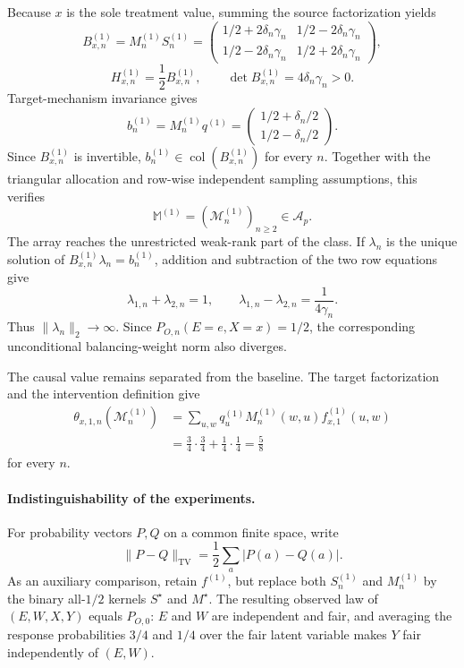 Because \(x\) is the sole treatment value, summing the source factorization yields
\[
B^{(1)}_{x,n}=M^{(1)}_nS^{(1)}_n=
\begin{pmatrix}
1/2+2\delta_n\gamma_n&1/2-2\delta_n\gamma_n\\
1/2-2\delta_n\gamma_n&1/2+2\delta_n\gamma_n
\end{pmatrix},
\]
\[
H^{(1)}_{x,n}=\frac12B^{(1)}_{x,n},
\qquad
\det B^{(1)}_{x,n}=4\delta_n\gamma_n>0.
\]
Target-mechanism invariance gives
\[
b^{(1)}_n=M^{(1)}_nq^{(1)}
=
\begin{pmatrix}1/2+\delta_n/2\\1/2-\delta_n/2\end{pmatrix}.
\]
Since \(B^{(1)}_{x,n}\) is invertible,
\(b^{(1)}_n\in\operatorname{col}(B^{(1)}_{x,n})\) for every \(n\). Together with the triangular allocation and row-wise independent sampling assumptions, this verifies
\[
\mathbb M^{(1)}=(\mathcal M^{(1)}_n)_{n\ge2}\in\mathcal A_p.
\]
The array reaches the unrestricted weak-rank part of the class. If \(\lambda_n\) is the unique solution of
\(B^{(1)}_{x,n}\lambda_n=b^{(1)}_n\), addition and subtraction of the two row equations give
\[
\lambda_{1,n}+\lambda_{2,n}=1,\qquad
\lambda_{1,n}-\lambda_{2,n}=\frac1{4\gamma_n}.
\]
Thus \(\lVert\lambda_n\rVert_2\to\infty\). Since
\(P_{O,n}(E=e,X=x)=1/2\), the corresponding unconditional balancing-weight norm also diverges.

The causal value remains separated from the baseline. The target factorization and the intervention definition give
\[
\begin{split}
\theta_{x,1,n}(\mathcal M^{(1)}_n)
&=\sum_{u,w}q^{(1)}_uM^{(1)}_n(w,u)f^{(1)}_{x,1}(u,w)\\
&=\frac34\cdot\frac34+\frac14\cdot\frac14
=\frac58
\end{split}
\]
for every \(n\).

\paragraph{Indistinguishability of the experiments.}
For probability vectors \(P,Q\) on a common finite space, write
\[
\lVert P-Q\rVert_{\mathrm{TV}}=\frac12\sum_a|P(a)-Q(a)|.
\]
As an auxiliary comparison, retain \(f^{(1)}\), but replace both
\(S^{(1)}_n\) and \(M^{(1)}_n\) by the binary all-\(1/2\) kernels
\(S^\star\) and \(M^\star\). The resulting observed law of
\((E,W,X,Y)\) equals \(P_{O,0}\): \(E\) and \(W\) are independent and fair, and averaging the response probabilities \(3/4\) and \(1/4\) over the fair latent variable makes \(Y\) fair independently of \((E,W)\).

